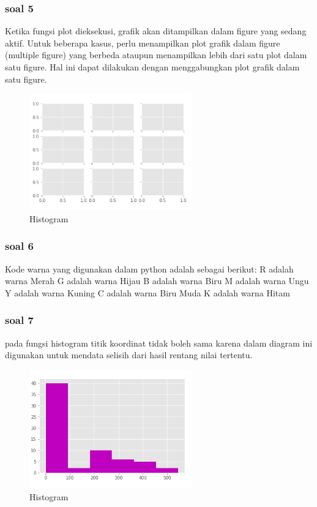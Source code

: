 \subsubsection{soal 5}
Ketika fungsi plot dieksekusi, grafik akan ditampilkan dalam figure yang sedang aktif. Untuk beberapa kasus, perlu menampilkan plot grafik dalam figure (multiple figure) yang berbeda ataupun menampilkan lebih dari satu plot dalam satu figure. Hal ini dapat dilakukan dengan menggabungkan plot grafik dalam satu figure.

\begin{figure}[H]
\centering
\includegraphics[width=7cm]{figures/6/1174009/multipel.png}
\caption{Histogram}
\label{dwiyul}
\end{figure}


\subsubsection{soal 6}
Kode warna yang digunakan dalam python adalah sebagai berikut:
R adalah warna Merah
G adalah warna Hijau
B adalah warna Biru
M adalah warna Ungu
Y adalah warna Kuning
C adalah warna Biru Muda
K adalah warna Hitam

\subsubsection{soal 7}
pada fungsi histogram titik koordinat tidak boleh sama karena dalam diagram ini digunakan untuk mendata selisih dari hasil rentang nilai tertentu.

\begin{figure}[H]
\centering
\includegraphics[width=7cm]{figures/6/1174009/1c.png}
\caption{Histogram}
\label{dwiyul}
\end{figure}


